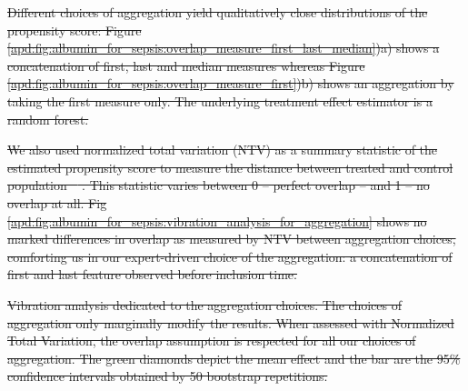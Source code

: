 \documentclass[10pt,letterpaper]{article}
\providecommand{\DIFdeltex}[1]{{\protect\color{red}\sout{#1}}}                      %
\providecommand{\DIFdelFL}[1]{\DIFdel{#1}} %
\providecommand{\DIFdel}[1]{\texorpdfstring{\DIFdeltex{#1}}{}} %
\begin{document}
{%
}%
{%
}%
{%
  \DIFdelFL{Different choices of aggregation yield qualitatively close
    distributions of the propensity score: Figure
    \ref{apd:fig:albumin_for_sepsis:overlap_measure_first_last_median})a)
    shows a concatenation of first, last and median measures whereas Figure
    \ref{apd:fig:albumin_for_sepsis:overlap_measure_first})b) shows an
    aggregation by taking the first measure only. The underlying treatment
    effect estimator is a random forest. }}%

\DIFdel{We also used normalized total variation (NTV) as a summary statistic of the
  estimated propensity score to measure the distance between treated and control
  population \mbox{%
    \cite{doutreligne2023select}}\hskip0pt%
  . This statistic varies between 0 --
  perfect overlap -- and 1 -- no overlap at all. Fig
  \ref{apd:fig:albumin_for_sepsis:vibration_analysis_for_aggregation} shows no
  marked differences in overlap as measured by NTV between aggregation choices,
  comforting us in our expert-driven choice of the aggregation: a concatenation
  of first and last feature observed before inclusion time.
}%

{%
  \DIFdelFL{Vibration analysis dedicated to the aggregation choices. The
    choices of aggregation only marginally modify the results. When assessed
    with Normalized Total Variation, the overlap assumption is respected for all
    our choices of aggregation. The green diamonds depict the mean effect and
    the bar are the 95\% confidence intervals obtained by 50 bootstrap
    repetitions.}}%
\end{document}
